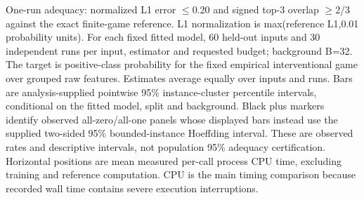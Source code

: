 One-run adequacy: normalized L1 error $\leq$0.20 and signed top-3 overlap $\geq$2/3 against the exact finite-game reference. L1 normalization is max(reference L1,0.01 probability units). For each fixed fitted model, 60 held-out inputs and 30 independent runs per input, estimator and requested budget; background B=32. The target is positive-class probability for the fixed empirical interventional game over grouped raw features. Estimates average equally over inputs and runs. Bars are analysis-supplied pointwise 95\% instance-cluster percentile intervals, conditional on the fitted model, split and background. Black plus markers identify observed all-zero/all-one panels whose displayed bars instead use the supplied two-sided 95\% bounded-instance Hoeffding interval. These are observed rates and descriptive intervals, not population 95\% adequacy certification. Horizontal positions are mean measured per-call process CPU time, excluding training and reference computation. CPU is the main timing comparison because recorded wall time contains severe execution interruptions.
